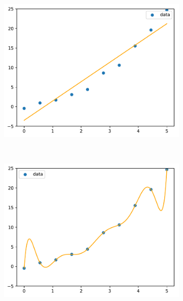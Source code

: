 \begin{figure}
  \centering
  \begin{subfigure}[b]{0.3\linewidth}
    \includegraphics[width=\linewidth]{obrazky/fitting1.pdf}
  \end{subfigure}
  ~
  \begin{subfigure}[b]{0.3\textwidth}
    \includegraphics[width=\linewidth]{obrazky/fitting9.pdf}
  \end{subfigure}
  ~
  \begin{subfigure}[b]{0.3\textwidth}

\end{subfigure}
\end{figure}
